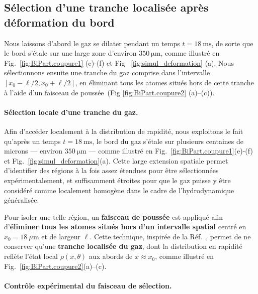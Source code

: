 
\subsection{Sélection d’une tranche localisée après déformation du bord}

{\color{blue}
Nous laissons d’abord le gaz se dilater pendant un temps $t=18~\mathrm{ms}$, de sorte que le bord s’étale sur une large zone d’environ $350~\mathrm{\mu m}$, comme illustré en Fig.~\ref{fig:BiPart.coupure1} (e)-(f) et  Fig ~\ref{fig:simul_deformation} (a).  
Nous sélectionnons ensuite une tranche du gaz comprise dans l’intervalle $[x_0-\ell/2, x_0+\ell/2]$, en éliminant tous les atomes situés hors de cette tranche à l’aide d’un faisceau de poussée~\cite{dubois_probing_2024}(Fig \ref{fig:BiPart.coupure2} (a)--(c)). 
 

}


\paragraph{Sélection locale d'une tranche du gaz.}

Afin d’accéder localement à la distribution de rapidité, nous exploitons le fait qu’après un temps $t = 18~\mathrm{ms}$, le bord du gaz s’étale sur plusieurs centaines de microns — environ $350~\mathrm{\mu m}$ — comme illustré en Fig.~\ref{fig:BiPart.coupure1}(e)-(f) et Fig.~\ref{fig:simul_deformation}(a). Cette large extension spatiale permet d’identifier des régions à la fois assez étendues pour être sélectionnées expérimentalement, et suffisamment étroites pour que le gaz puisse y être considéré comme localement homogène dans le cadre de l’hydrodynamique généralisée.

\medskip
\noindent
Pour isoler une telle région, un {\bf faisceau de poussée} est appliqué afin d’{\bf éliminer tous les atomes situés hors d’un intervalle spatial} centré en $x_0 = 18~\mu\mathrm{m}$ et de largeur $\ell$. Cette technique, inspirée de la Réf.~\cite{dubois_probing_2024}, permet de ne conserver qu’une {\bf tranche localisée du gaz}, dont la distribution en rapidité reflète l’état local $\rho(x,\theta)$ aux abords de $x \approx x_0$, comme illustré en Fig.~\ref{fig:BiPart.coupure2}(a)--(c).


\medskip
\paragraph{Contrôle expérimental du faisceau de sélection.}

